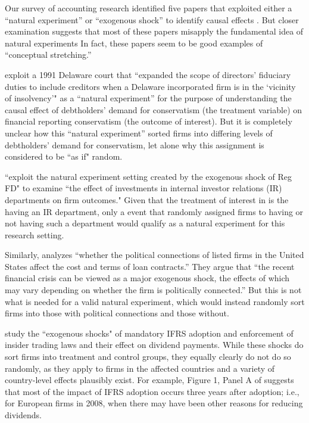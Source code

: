 \documentclass[11pt,reqno,titlepage]{amsart}
\begin{document}
\begin{doublespace}
Our survey of accounting research identified five papers that exploited either a ``natural experiment'' or ``exogenous shock'' to identify causal effects \citep{Lo:2013jk,Aier:2014ii,Kirk:2014gx,Houston:2014hv,Hail:2014fq}.
But closer examination suggests that most of these papers misapply the fundamental idea of natural experiments  In fact, these papers seem to be good examples of ``conceptual stretching.''

\cite{Aier:2014ii} exploit a 1991 Delaware court that ``expanded the scope of directors' fiduciary duties to include creditors when a Delaware incorporated firm is in the `vicinity of insolvency'" as a ``natural experiment'' for the purpose of understanding the causal effect of debtholders' demand for conservatism (the treatment variable) on financial reporting conservatism (the outcome of interest).
But it is completely unclear how this ``natural experiment'' sorted firms into differing levels of debtholders' demand for conservatism, let alone why this assignment is considered to be ``as if" random.

\citet{Kirk:2014gx} ``exploit the natural experiment setting created by the exogenous shock of Reg FD" to examine ``the effect of investments in internal investor relations (IR) departments on firm outcomes."
Given that the treatment of interest in \citet{Kirk:2014gx} is the having an IR department, only a event that randomly assigned firms to having or not having such a department would qualify as a natural experiment for this research setting. 

Similarly, \citet{Houston:2014hv} analyzes ``whether the political connections of listed firms in the United States affect the cost and terms of loan contracts.'' 
They argue that ``the recent financial crisis can be viewed as a major exogenous shock, the effects of which may vary depending on whether the firm is politically connected.'' 
But this is not what is needed for a valid natural experiment, which would instead randomly sort firms into those with political connections and those without. 

\citet{Hail:2014fq} study the ``exogenous shocks" of mandatory IFRS adoption and enforcement of insider trading laws and their effect on dividend payments.
While these shocks do sort firms into treatment and control groups, they equally clearly do not do so randomly, as they apply to firms in the affected countries and a variety of country-level effects plausibly exist. 
For example, Figure 1, Panel A of \citet{Hail:2014fq} suggests that most of the impact of IFRS adoption occurs three years after adoption; i.e., for European firms in 2008, when there may have been other reasons for reducing dividends.


\end{doublespace}
\end{document}
